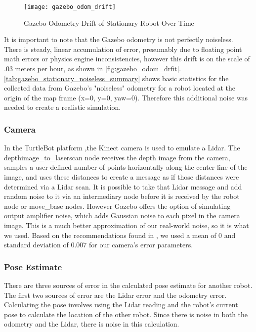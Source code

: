\documentclass[thesis.tex]{subfile}
\begin{document}


\begin{figure}
\centering
\texttt{[image: gazebo\_odom\_drift]}
\caption{Gazebo Odometry Drift of Stationary Robot Over Time}
\label{fig:gazebo_odom_drfit}
\end{figure}


It is important to note that the Gazebo odometry is not perfectly noiseless. There is steady, linear accumulation of error, presumably due to floating point math errors or physics engine inconsistencies, however this drift is on the scale of $.03$ meters per hour, as shown in \autoref{fig:gazebo_odom_drfit}. \autoref{tab:gazebo_stationary_noiseless_summary} shows basic statistics for the collected data from Gazebo's "noiseless" odometry for a robot located at the origin of the map frame (x=0, y=0, yaw=0). Therefore this additional noise was needed to create a realistic simulation.


\subsubsection{Camera}
In the TurtleBot platform ,the Kinect camera is used to emulate a Lidar. The depthimage\_to\_laserscan node receives the depth image from the camera, samples a user-defined number of points horizontally along the center line of the image, and uses these distances to create a message as if those distances were determined via a Lidar scan. It is possible to take that Lidar message and add random noise to it via an intermediary node before it is received by the robot node or move\_base nodes. However Gazebo offers the option of simulating output amplifier noise, which adds Gaussian noise to each pixel in the camera image. This is a much better approximation of our real-world noise, so it is what we used. Based on the recommendations found in \cite{GazeboSensorNoise}, we used a mean of 0 and standard deviation of 0.007 for our camera's error parameters.

\subsubsection{Pose Estimate}
There are three sources of error in the calculated pose estimate for another robot. The first two sources of error are the Lidar error and the odometry error. Calculating the pose involves using the Lidar reading and the robot's current pose to calculate the location of the other robot. Since there is noise in both the odometry and the Lidar, there is noise in this calculation.
\end{document}
